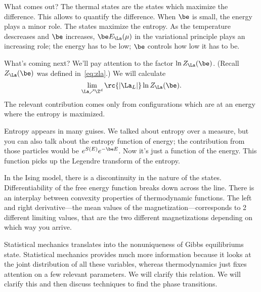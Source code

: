 What comes out? The thermal states are the states which maximize the difference. This allows to quantify the difference. When $\be$ is small, the energy plays a minor role. The states maximize the entropy. As the temperature descreases and $\be$ increases, $\be E_\La(\mu)$ in the variational principle plays an increasing role; the energy has to be low; $\be$ controls how low it has to be. 

What's coming next? We'll pay attention to the factor $\ln Z_\La(\be)$. (Recall $Z_\La(\be)$ was defined in~\eqref{eq:zla}.) We will calculate 
\[\lim_{\La \nearrow\Z^d} \rc{|\La_L|} \ln Z_{\La}(\be).\]
The relevant contribution comes only from configurations which are at an energy where the entropy is maximized. 

Entropy appears in many guises. We talked about entropy over a measure, but you can also talk about the entropy function of energy; the contribution from those particles would be $e^{S(E)}e^{-\be E}$. Now it's just a function of the energy. This function picks up the Legendre transform of the entropy.


In the Ising model, there is a discontinuity in the nature of the states. Differentiability of the free energy function breaks down across the line. There is an interplay between convexity properties of thermodynamic functions. The left and right derivative---the mean values of the magnetization---corresponds to 2 different limiting values, that are the two different magnetizations depending on which way you arrive. %

Statistical mechanics translates into the nonuniqueness of Gibbs equilibriums state. Statistical mechanics provides much more information because it looks at the joint distribution of all these variables, whereas thermodynamics just fixes attention on a few relevant parameters. We will clarify this relation. 
We will clarify this and then discuss techniques to find the phase transitions.


